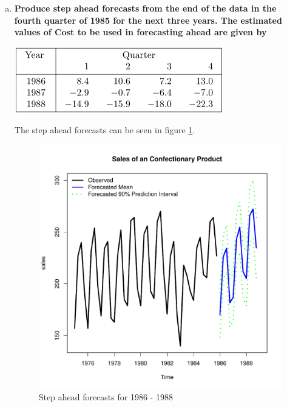 \documentclass{article}
\begin{document}
\begin{enumerate}[(a)]
\begin{figure}
		\end{figure}
		
		\item \textbf{Produce step ahead forecasts from the end of the data in the fourth quarter of 1985 for the next three years. The estimated values of Cost to be used in forecasting ahead are given by}
		\begin{center}
			\includegraphics[width=0.5\linewidth]{CostFuture}
		\end{center}
		The step ahead forecasts can be seen in figure \ref{fig:stepahead}.
		
		\begin{figure}
			\centering
			\includegraphics[width=0.7\linewidth]{StepAhead}
			\caption{Step ahead forecasts for 1986 - 1988}
			\label{fig:stepahead}
		\end{figure}
		
		
		
	\end{enumerate}

\nocite{prado2010time}
\nocite{harrison1999bayesian}


	
\end{document}

